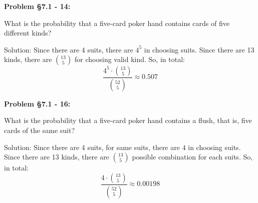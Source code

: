 \documentclass{article}
\newenvironment{problem}[1]
{\begin{mdframed}[default]
\textbf{Problem #1:}
}
{\end{mdframed}
}
\begin{document}
\begin{problem}{\S 7.1 - 14}
What is the probability that a five-card poker hand contains cards of five
different kinds?

Solution:
Since there are 4 suits, there are $4^5$ in choosing suits.
Since there are 13 kinds, there are ${13\choose 5}$ for choosing valid kind.
So, in total:
\[\frac{4^5\cdot {13\choose 5}}{{52 \choose 5}}\approx 0.507\]
\end{problem}
\begin{problem}{\S 7.1 - 16}
What is the probability that a five-card poker hand contains a flush, that is, five
cards of the same suit?

Solution:
Since there are 4 suits, for same suits, there are $4$ in choosing suits.
Since there are 13 kinds, there are ${13\choose 5}$ possible combination for each suits.
So, in total:
\[\frac{4\cdot{13\choose 5} }{{52\choose 5}}\approx 0.00198\]
\end{problem}
\end{document}
